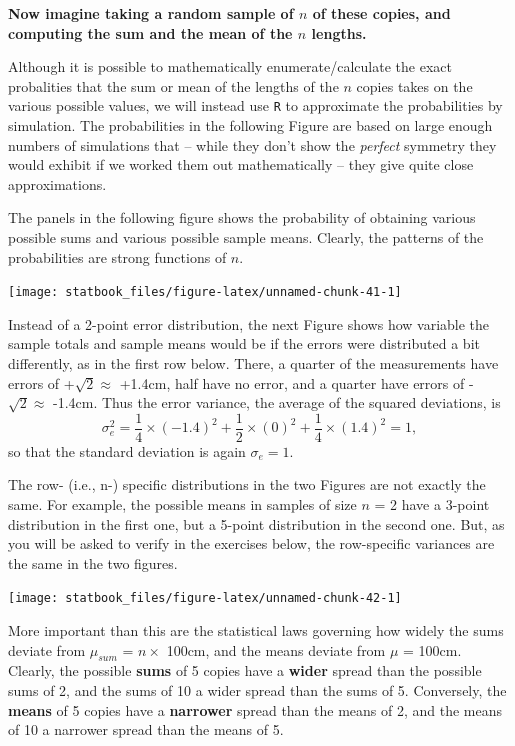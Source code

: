 \documentclass[]{book}
\begin{document}
\textbf{Now imagine taking a random sample of \(n\) of these copies, and computing the sum and the mean of the \(n\) lengths.}

Although it is possible to mathematically enumerate/calculate the exact probalities that the sum or mean of the lengths of the \(n\) copies takes on the various possible values, we will instead use \texttt{R} to approximate the probabilities by simulation. The probabilities in the following Figure are based on large enough numbers of simulations that -- while they don't show the \emph{perfect} symmetry they would exhibit if we worked them out mathematically -- they give quite close approximations.

The panels in the following figure shows the probability of obtaining various possible sums and various possible sample means. Clearly, the patterns of the probabilities are strong functions of \(n.\)

\begin{center}\texttt{[image: statbook\_files/figure-latex/unnamed-chunk-41-1]} \end{center}

Instead of a 2-point error distribution, the next Figure shows how variable the sample totals and sample means would be if the errors were distributed a bit differently, as in the first row below. There, a quarter of the measurements have errors of +\(\sqrt{2} \approx\) +1.4cm, half have no error, and a quarter have errors of -\(\sqrt{2} \approx\) -1.4cm. Thus the error variance, the average of the squared deviations, is
\[\sigma_e^2 = \frac{1}{4} \times (-1.4)^2  +  \frac{1}{2} \times (0)^2 +  \frac{1}{4} \times (1.4)^2 = 1,\] so that the standard deviation is again \(\sigma_e = 1.\)

The row- (i.e., n-) specific distributions in the two Figures are not exactly the same. For example, the possible means in samples of size \(n\) = 2 have a 3-point distribution in the first one, but a 5-point distribution in the second one. But, as you will be asked to verify in the exercises below, the row-specific variances are the same in the two figures.

\begin{center}\texttt{[image: statbook\_files/figure-latex/unnamed-chunk-42-1]} \end{center}

More important than this are the statistical laws governing how widely the sums deviate from \(\mu_{sum}\) = \(n \times\) 100cm, and the means deviate from \(\mu\) = 100cm. Clearly, the possible \textbf{sums} of 5 copies have a \textbf{wider} spread than the possible sums of 2, and the sums of 10 a wider spread than the sums of 5. Conversely, the \textbf{means} of 5 copies have a \textbf{narrower} spread than the means of 2, and the means of 10 a narrower spread than the means of 5.
\end{document}
